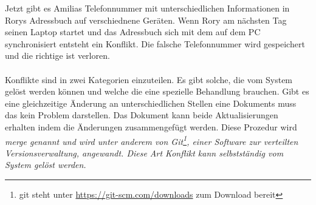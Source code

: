 Jetzt gibt es Amilias Telefonnummer mit unterschiedlichen Informationen in Rorys Adressbuch auf verschiednene Geräten.
Wenn Rory am nächsten Tag seinen Laptop startet und das Adressbuch sich mit dem auf dem PC synchronisiert entsteht ein Konflikt. Die falsche Telefonnummer wird gespeichert und die richtige ist verloren.\\\\
%
%
Konflikte sind in zwei Kategorien einzuteilen. Es gibt solche, die vom System gelöst werden können und welche die eine spezielle Behandlung brauchen.
Gibt es eine gleichzeitige Änderung an unterschiedlichen Stellen eine Dokuments muss das kein Problem darstellen.
Das Dokument kann beide Aktualisierungen erhalten indem die Änderungen zusammengefügt werden.
Diese Prozedur wird \it{merge} genannt und wird unter anderem von Git\footnote{git steht unter \url{https://git-scm.com/downloads} zum Download bereit}, einer Software zur verteilten Versionsverwaltung, angewandt. Diese Art Konflikt kann selbstständig vom System gelöst werden.\\

